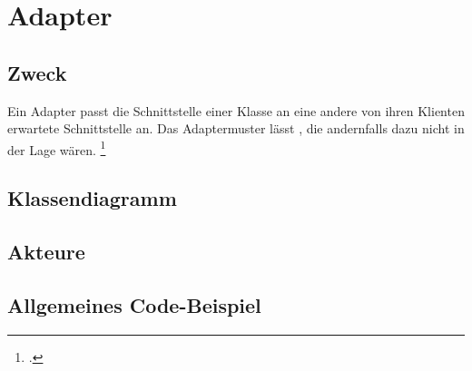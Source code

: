 \documentclass{bschlangaul-haupt}
\begin{document}

\chapter{Adapter}

\begin{liQuellen}
\item \cite{wiki:adapter}
\item \cite[Seite 120-129]{gof}
\item \cite[Kapitel 8., Seite 255]{schatten}
\item \cite[Kapitel 5.1, Seite 77-79]{eilebrecht}
\item \cite[Kapitel 20, Seite 243]{siebler}
\end{liQuellen}

\section{Zweck}

Ein Adapter passt die Schnittstelle einer Klasse an eine andere von
ihren Klienten erwartete Schnittstelle an. Das Adaptermuster lässt
, die andernfalls dazu nicht in der Lage
wären.
\footcite[Seite 77]{eilebrecht}

%

\section{Klassendiagramm}

\liEntwurfsAdapterUml

%

\section{Akteure}

\liEntwurfsAdapterAkteure

%

\section{Allgemeines Code-Beispiel}

\liEntwurfsAdapterCode

\literatur
\end{document}
